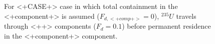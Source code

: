 
\begin{figure}[ht]
\caption[$^{235}U$ residence. Lumped Parameter  <+Component+> No Release.]{
For <+CASE+> case in which total containment in the <+component+> is assumed 
($F_{d,<+comp+>}=0$), $^{235}U$ travels through <++> components ($F_d = 0.1$) before 
permanent residence in the <+component+> component.
}
\label{fig:lpIall}
\end{figure}
